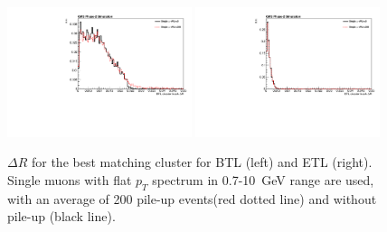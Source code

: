 \begin{figure}[!h]
\centering
\includegraphics[width=0.48\textwidth]{fig/performance/ClusterAndTracks/BTLbestCluster_DR_muPUcomp.pdf}
\includegraphics[width=0.48\textwidth]{fig/performance/ClusterAndTracks/ETLbestCluster_DR_muPUcomp.pdf}
\caption{$\Delta R$ for the best matching cluster for BTL (left) and ETL (right). Single muons with flat $p_{T}$ spectrum in 0.7-10~GeV range are used,  with an average of 200 pile-up events(red dotted line) and without pile-up (black line).}
\label{fig:clusterMuPuComp_DeltaR}
\end{figure}


